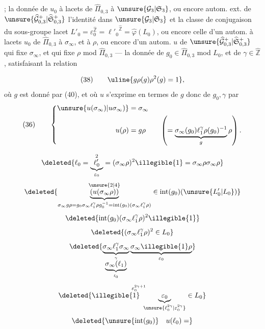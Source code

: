 ; la donnée de $u_0$
 
à lacets de $\widehat{\Pi}_{0,3}$  à
$\unsure{\mathcal G_3|\mathfrak S_3}$, ou encore
 autom. ext. de $\unsure{\widehat{\mathcal G}_{0,3}^{+}|\widehat{\mathfrak S}_{0,3}^{+}}$
 l'identité dans $\unsure{\mathcal G_3|\mathfrak S_3}$
et 
 la classe de conjugaison
du sous-groupe lacet
$L'_0=\varepsilon_0^{\widehat{\mathbb Z}}={\ell'_0}^{\widehat{\mathbb Z}}
=\widehat{\varphi}(L_0)$,
ou encore celle d'un autom. à lacets
$u_0$ de $\widehat{\Pi}_{0,3}$  à
$\sigma_\infty$, et  à $\rho$,
ou encore d'un autom. $u$ de $\unsure{\widehat{\mathcal G}_{0,3}^{+}|\widehat{\mathfrak S}_{0,3}^{+}}$
qui fixe $\sigma_\infty$, et qui fixe $\rho$ mod $\widehat{\Pi}_{0,3}$
---  la donnée de $g_0\in\widehat{\Pi}_{0,3}$ mod $L_0$,
et de $\gamma\in\widehat{\mathbb Z}$, satisfaisant la relation


\[
(38)\qquad \uline{g\rho(g)\rho^2(g)=1},
\]
où $g$ est donné par (40), et où $u$ s'exprime en termes de
 $g$ donc de $g_0,\gamma$ par
\[
(36)\qquad
\left\{\begin{aligned}
\unsure{u(\sigma_\infty)|u\sigma_\infty)}&=\sigma_\infty\\
u(\rho)&=g\rho\qquad
\left(=\underbrace{\sigma_\infty(g_0)\ell_1^\gamma\rho(g_0)^{-1}}_g\rho\right).
\end{aligned}\right.
\]

\[
\deleted{\ell_0=\underbrace{{\ell'_0}}_{\varepsilon_0}^{2}
=(\sigma_\infty\rho)^2\illegible{1}
=\sigma_\infty\rho\sigma_\infty\rho}
\]
\[
\deleted{\underbrace{(u(\sigma_\infty\rho))}_{
\substack{\sigma_\infty g\rho=g_0\sigma_\infty \ell_1^\gamma\rho g_0^{-1}
=\operatorname{int}(g_0)(\sigma_\infty \ell_1^\gamma\rho)}}^{\unsure{2|4}}
\in\operatorname{int}(g_0)(\unsure{L'_0|L_0})}
\]
\[
\deleted{\operatorname{int}(g_0)(\sigma_\infty \ell_1^\gamma\rho)^2\illegible{1}}
\]
\[
\deleted{(\sigma_\infty \ell_1^\gamma\rho)^2\in L_0}
\]
\[
\deleted{
\underbrace{\sigma_\infty \ell_1^\gamma\sigma_\infty}_{
    \underbrace{\sigma_\infty(\ell_1)}_{\ell_0}^{\gamma}}
  \underbrace{\sigma_\infty\illegible{1}\rho}_{\varepsilon_0}
}
\]
\[
\deleted{\overset{\varepsilon_0^{2\gamma+1}}{
\illegible{1}\ \underbrace{\varepsilon_0}_{\unsure{\ell_0^{2\gamma}|\varepsilon_0^{2\gamma}}}}
\in L_0}
\]
\[
\deleted{\unsure{\operatorname{int}(g_0)}\quad u(\ell_0)=}
\]

